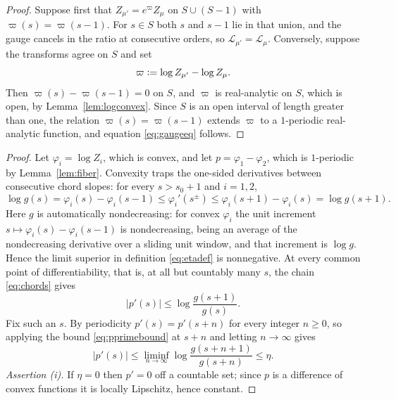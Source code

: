 \documentclass[sn-mathphys-num]{sn-jnl}
\theoremstyle{thmstyleone}%
\theoremstyle{thmstyletwo}%
\theoremstyle{thmstylethree}%
\theoremstyle{thmstyleone}%
\providecommand{\Leh}{\mathscr{L}}
\providecommand{\eqdef}{\mathrel{\vcentcolon=}}
\begin{document}
\begin{appendices}
		\lemfiber*
		
		\begin{proof}
			Suppose first that $Z_{\mu'}=e^{\varpi}Z_\mu$ on $S\cup(S-1)$
			with $\varpi(s)=\varpi(s-1)$. For $s\in S$ both $s$ and $s-1$ lie
			in that union, and the gauge cancels in the ratio at consecutive
			orders, so $\Leh_{\mu'}=\Leh_\mu$. Conversely, suppose the
			transforms agree on $S$ and set
			\begin{equation}\label{eq:pidef}
				\varpi\eqdef\log Z_{\mu'}-\log Z_\mu .
			\end{equation}
			Then $\varpi(s)-\varpi(s-1)=0$ on $S$, and $\varpi$ is
			real-analytic on $S$, which is open, by
			Lemma~\ref{lem:logconvex}. Since $S$ is an open
			interval of length greater than one, the relation
			$\varpi(s)=\varpi(s-1)$ extends $\varpi$ to a $1$-periodic real-analytic
			function, and equation \eqref{eq:gaugeeq} follows.
		\end{proof}
		
		\thmrigidity*
		
		\begin{proof}
			Let $\varphi_i=\log Z_i$, which is convex, and let
			$p=\varphi_1-\varphi_2$, which is $1$-periodic by
			Lemma~\ref{lem:fiber}. Convexity traps the one-sided derivatives
			between consecutive chord slopes: for every $s>s_0+1$ and
			$i=1,2$,
			\begin{equation}\label{eq:chords}
				\log g(s)=\varphi_i(s)-\varphi_i(s-1)
				\le\varphi_i'(s^{\pm})
				\le\varphi_i(s+1)-\varphi_i(s)=\log g(s+1).
			\end{equation}
			Here $g$ is automatically nondecreasing: for convex $\varphi_i$
			the unit increment $s\mapsto\varphi_i(s)-\varphi_i(s-1)$ is
			nondecreasing, being an average of the nondecreasing derivative
			over a sliding unit window, and that increment is $\log g$. Hence
			the limit superior in definition \eqref{eq:etadef} is nonnegative.
			At every common point of differentiability, that is, at all but
			countably many $s$, the chain \eqref{eq:chords} gives
			\begin{equation}\label{eq:pprimebound}
				|p'(s)|\le\log\frac{g(s+1)}{g(s)} .
			\end{equation}
			Fix such an $s$. By periodicity $p'(s)=p'(s+n)$ for every integer
			$n\ge0$, so applying the bound \eqref{eq:pprimebound} at $s+n$ and
			letting $n\to\infty$ gives
			\begin{equation}\label{eq:pprimeeta}
				|p'(s)|\le\liminf_{n\to\infty}\log\frac{g(s+n+1)}{g(s+n)}
				\le\eta .
			\end{equation}
			\emph{Assertion (i).} If $\eta=0$ then $p'=0$ off a countable set;
			since $p$ is a difference of convex functions it is locally
			Lipschitz, hence constant.
			

\end{proof}
\end{appendices}
\end{document}
